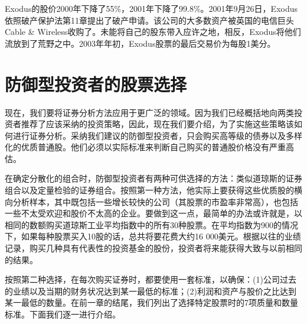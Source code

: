 \documentclass[12pt,oneside]{book}
\begin{document}
Exodus的股价2000年下降了55\%，2001年下降了99.8\%。2001年9月26日，Exodus依照破产保护法第11章提出了破产申请。该公司的大多数资产被英国的电信巨头Cable \& Wireless收购了。未能将自己的股东带入应许之地，相反，Exodus将他们流放到了荒野之中。2003年年初，Exodus股票的最后交易价为每股1美分。


\section{防御型投资者的股票选择}
现在，我们要将证券分析方法应用于更广泛的领域。因为我们已经概括地向两类投资者推荐了应该采纳的投资策略，因此，现在我们要介绍，为了实施这些策略该如何进行证券分析。采纳我们建议的防御型投资者，只会购买高等级的债券以及多样化的优质普通股。他们必须以实际标准来判断自己购买的普通股价格没有严重高估。

在确定分散化的组合时，防御型投资者有两种可供选择的方法：类似道琼斯的证券组合以及定量检验的证券组合。按照第一种方法，他实际上要获得这些优质股的横向分析样本，其中既包括一些增长较快的公司（其股票的市盈率非常高），也包括一些不太受欢迎和股价不太高的企业。要做到这一点，最简单的办法或许就是，以相同的数额购买道琼斯工业平均指数中的所有30种股票。在平均指数为900的情况下，如果每种股票买入10股的话，总共将要花费大约16 000美元。根据以往的业绩记录，购买几种具有代表性的投资基金的股份，投资者将来能获得大致与以前相同的结果。

按照第二种选择，在每次购买证券时，都要使用一套标准，以确保：(1)公司过去的业绩以及当期的财务状况达到某一最低的标准；(2)利润和资产与股价之比达到某一最低的数量。在前一章的结尾，我们列出了选择特定股票时的7项质量和数量标准。下面我们逐一进行介绍。
\end{document}
